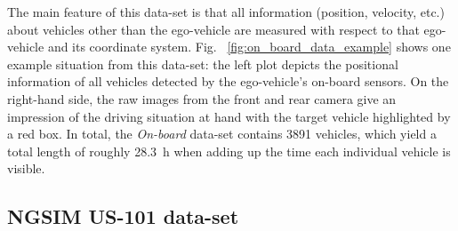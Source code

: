 The main feature of this data-set is that all information (position, velocity, etc.) about vehicles other than the ego-vehicle are measured with respect to that ego-vehicle and its coordinate system.
Fig. ~\ref{fig:on_board_data_example} shows one example situation from this data-set: the left plot depicts the positional information of all vehicles detected by the ego-vehicle's on-board sensors.
On the right-hand side, the raw images from the front and rear camera give an impression of the driving situation at hand with the target vehicle highlighted by a red box.
In total, the \emph{On-board} data-set contains \num{3891} vehicles, which yield a total length of roughly \SI{28.3}{\hour} when adding up the time each individual vehicle is visible.

\subsection{\acs{NGSIM} US-101 data-set}
\label{subsec:ngsim-dataset}

